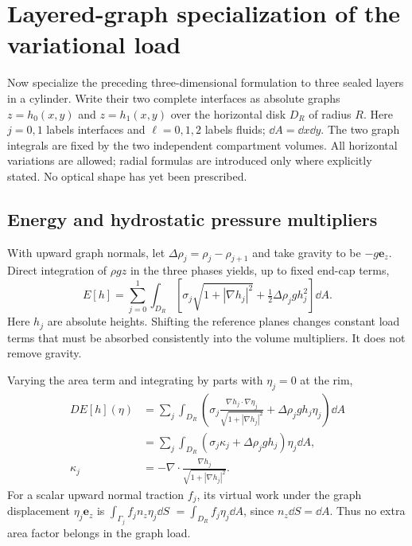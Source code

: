 
\clearpage

\section{Layered-graph specialization of the variational load}
\label{sec:layered-specialization}
Now specialize the preceding three-dimensional formulation to three sealed
layers in a cylinder. Write their two complete interfaces as absolute graphs
$z=h_0(x,y)$ and $z=h_1(x,y)$ over the horizontal disk $D_R$ of radius $R$.
Here $j=0,1$ labels interfaces and $\ell=0,1,2$ labels fluids; $\dd A=\dd x\dd y$.
The two graph integrals are fixed by the two independent compartment volumes.
All horizontal variations are allowed; radial formulas are introduced only
where explicitly stated. No optical shape has yet been prescribed.

\subsection{Energy and hydrostatic pressure multipliers}
With upward graph normals, let $\Delta\rho_j=\rho_j-\rho_{j+1}$ and
take gravity to be $-g\mathbf e_z$. Direct integration of $\rho gz$ in the
three phases yields, up to fixed end-cap terms,
\begin{equation}\label{eq:energy}
 E[h]=\sum_{j=0}^1\int_{D_R}
 \left[\sigma_j\sqrt{1+|\nabla h_j|^2}
 +\tfrac12\Delta\rho_jg h_j^2\right]\dd A.
\end{equation}
Here $h_j$ are absolute heights. Shifting the reference planes changes
constant load terms that must be absorbed consistently into the volume
multipliers. It does not remove gravity.

Varying the area term and integrating by parts with $\eta_j=0$ at the rim,
\begin{align}
 DE[h](\eta)&=\sum_j\int_{D_R}
 \left(\sigma_j\frac{\nabla h_j\cdot\nabla\eta_j}
 {\sqrt{1+|\nabla h_j|^2}}+\Delta\rho_jg h_j\eta_j\right)\dd A\label{eq:first-var}\\
 &=\sum_j\int_{D_R}(\sigma_j\kappa_j+\Delta\rho_jg h_j)\eta_j\dd A,\\
 \kappa_j&=-\nabla\cdot\frac{\nabla h_j}{\sqrt{1+|\nabla h_j|^2}}.
\end{align}
For a scalar upward normal traction $f_j$, its virtual work under the graph
displacement $\eta_j\mathbf e_z$ is $\int_{\Gamma_j}f_jn_z\eta_j\dd S$
$=\int_{D_R}f_j\eta_j\dd A$, since $n_z\dd S=\dd A$.
Thus no extra area factor belongs in the graph load.

